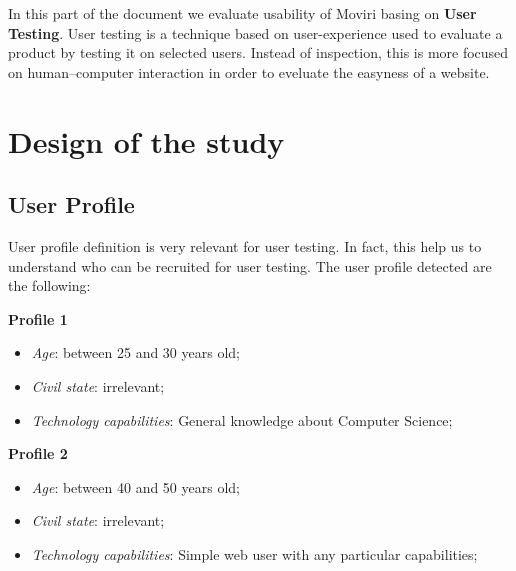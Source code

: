In this part of the document we evaluate usability of Moviri basing on \textbf{User Testing}. User testing is a technique based on user-experience used to evaluate a product by testing it on selected users. Instead of inspection, this is more focused on human–computer interaction in order to eveluate the easyness of a website.

\section{Design of the study}
\subsection{User Profile}
User profile definition is very relevant for user testing. In fact, this help us to understand who can be recruited for user testing. The user profile detected are the following:

\medskip
\textbf{Profile 1}\par
\begin{itemize}
\item \textit{Age}: between 25 and 30 years old;
\item \textit{Civil state}: irrelevant;
\item \textit{Technology capabilities}: General knowledge about Computer Science;
\end{itemize}

\medskip
\textbf{Profile 2}\par
\begin{itemize}
\item \textit{Age}: between 40 and 50 years old;
\item \textit{Civil state}: irrelevant;
\item \textit{Technology capabilities}: Simple web user with any particular capabilities;
\end{itemize}

